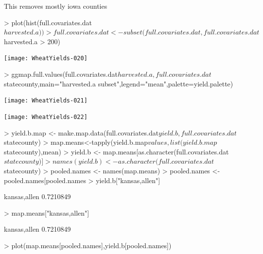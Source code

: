 \documentclass{report}
\begin{document}
This removes mostly iowa counties
\begin{Schunk}
\begin{Sinput}
> plot(hist(full.covariates.dat$harvested.a))
> full.covariates.dat <- subset(full.covariates.dat,full.covariates.dat$harvested.a > 200)
\end{Sinput}
\end{Schunk}
\texttt{[image: WheatYields-020]}

\begin{Schunk}
\begin{Sinput}
> ggmap.full.values(full.covariates.dat$harvested.a,full.covariates.dat$statecounty,main="harvested.a subset",legend="mean",palette=yield.palette)
\end{Sinput}
\end{Schunk}
\texttt{[image: WheatYields-021]}

\begin{Schunk}
\end{Schunk}
\texttt{[image: WheatYields-022]}





\begin{Schunk}
\begin{Sinput}
> yield.b.map <- make.map.data(full.covariates.dat$yield.b,full.covariates.dat$statecounty)
> map.means<-tapply(yield.b.map$values,list(yield.b.map$statecounty),mean)
> yield.b <- map.means[as.character(full.covariates.dat$statecounty)]
> names(yield.b) <- as.character(full.covariates.dat$statecounty)
> pooled.names <- names(map.means)
> pooled.names <- pooled.names[pooled.names %
> yield.b["kansas,allen"]
\end{Sinput}
\begin{Soutput}
kansas,allen 
   0.7210849 
\end{Soutput}
\begin{Sinput}
> map.means["kansas,allen"]
\end{Sinput}
\begin{Soutput}
kansas,allen 
   0.7210849 
\end{Soutput}
\begin{Sinput}
> plot(map.means[pooled.names],yield.b[pooled.names])
\end{Sinput}
\end{Schunk}
\end{document}
